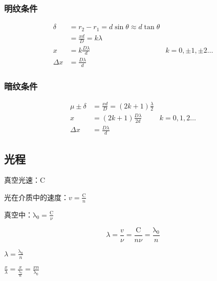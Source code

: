 \subsubsection{明纹条件}

\begin{equation}
    \begin{aligned}
        \delta{}  & =r_2-r_1=d\sin{\theta}\approx{d\tan{\theta}}                          \\
                  & =\frac{xd}{D}=k\lambda{}                                              \\
        x         & =k\frac{D\lambda}{d}                         & k=0,\pm{1},\pm{2}\dots \\
        \Delta{x} & =\frac{D\lambda}{d}
    \end{aligned}
\end{equation}

\subsubsection{暗纹条件}

\begin{equation}
    \begin{aligned}
        \mu{}\pm\delta{} & =\frac{xd}{D}=(2k+1)\frac{\lambda{}}{2}                \\
        x                & =(2k+1)\frac{D\lambda}{2d}              & k=0,1,2\dots \\
        \Delta{x}        & =\frac{D\lambda}{d}
    \end{aligned}
\end{equation}

\subsection{光程}


真空光速：$\mathrm{C}$

光在介质中的速度：$v=\frac{\mathrm{C}}{n}$

真空中：$\mathrm{\lambda{}_0}=\frac{\mathrm{C}}{\nu}$

\begin{equation}
    \lambda{}=\frac{v}{\nu}=\frac{\mathrm{C}}{n\nu}=\frac{\mathrm{\lambda_0}}{n}
\end{equation}

$\lambda=\frac{\mathrm{\lambda_0}}{n}$

$\frac{x}{\lambda}=\frac{x}{\frac{\mathrm{\lambda_0}}{n}}=\frac{xn}{\mathrm{\lambda_0}}$

